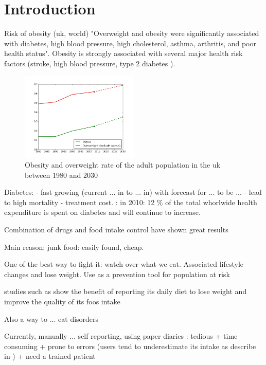 \chapter{Introduction}

Risk of obesity (uk, world) "Overweight and obesity were significantly associated with diabetes, high blood pressure, high cholesterol, asthma, arthritis, and poor health status". Obesity is strongly associated with several major health risk factors (stroke, high blood pressure, type 2 diabetes  \cite{Mokdad2003}).

\begin{figure}[h]
    \centering
    \includegraphics[width=0.5\textwidth,  height=0.455\textwidth ]{img/obesity_uk.jpg}
    \caption{Obesity and overweight rate of the adult population in the uk between 1980 and 2030}
    \label{fig:obesity_uk}
\end{figure}

Diabetes:
- fast growing (current ... in to ... in) with forecast for ... to be ...
- lead to high mortality
- treatment cost. \cite{Zhang2010}: in 2010: 12 \% of the total whorlwide health expenditure is spent on diabetes and will continue to increase.

Combination of drugs and food intake control have shown great results

Main reason: junk food: easily found, cheap.

One of the best way to fight it: watch over what we eat. Associated lifestyle changes and lose weight. Use as a prevention tool for population at risk

studies such as \cite{Burke2011a} show the benefit of reporting its daily diet to lose weight and improve the quality of its foos intake

Also a way to ... eat disorders

Currently, manually ... self reporting, using paper diaries : tedious + time consuming + prone to errors (users tend to underestimate its intake as describe in \cite{Lichtman1992}) + need a trained patient

